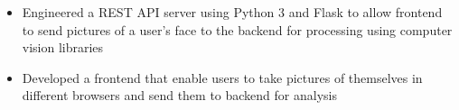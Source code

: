 
\begin{itemize}
  \item Engineered a REST API server using Python 3 and Flask
  to allow frontend to send pictures of a user’s face to the backend for
  processing using computer vision libraries
  \item Developed a frontend that enable users to take pictures of themselves
  in different browsers and send them to backend for analysis
\end{itemize}

